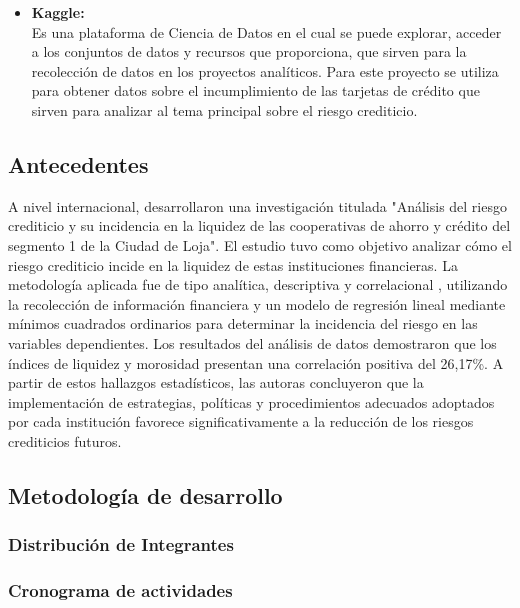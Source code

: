 \documentclass[12pt,a4paper]{article}
\begin{document}
\begin{itemize}[label=-]
          Es una biblioteca que se utiliza para la visualización de datos en Python en el cual ofrece la creación de una variedad de gráficos estadísticos, estáticos, dinámicos y así poder analizar los resultados que se obtengan de los datos y facilitar su interpretación.
    \item \textbf{Kaggle:}\\
          Es una plataforma de Ciencia de Datos en el cual se puede explorar, acceder a los conjuntos de datos y recursos que proporciona, que sirven para la recolección de datos en los proyectos analíticos. Para este proyecto se utiliza para obtener datos sobre el incumplimiento de las tarjetas de crédito que sirven para analizar al tema principal sobre el riesgo crediticio.
\end{itemize}
\subsection{Antecedentes}

A nivel internacional, \textcite{torres2024analisis} desarrollaron una investigación titulada "Análisis del riesgo crediticio y su incidencia en la liquidez de las cooperativas de ahorro y crédito del segmento 1 de la Ciudad de Loja". El estudio tuvo como objetivo analizar cómo el riesgo crediticio incide en la liquidez de estas instituciones financieras. La metodología aplicada fue de tipo analítica, descriptiva y correlacional , utilizando la recolección de información financiera y un modelo de regresión lineal mediante mínimos cuadrados ordinarios para determinar la incidencia del riesgo en las variables dependientes. Los resultados del análisis de datos demostraron que los índices de liquidez y morosidad presentan una correlación positiva del 26,17\%. A partir de estos hallazgos estadísticos, las autoras concluyeron que la implementación de estrategias, políticas y procedimientos adecuados adoptados por cada institución favorece significativamente a la reducción de los riesgos crediticios futuros.

\subsection{Metodología de desarrollo}
\subsubsection{Distribución de Integrantes}
\subsubsection{Cronograma de actividades}
\end{document}
